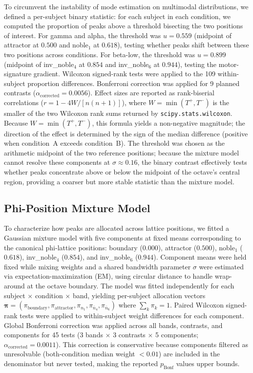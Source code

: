 \documentclass[11pt,a4paper]{article}
\begin{document}
To circumvent the instability of mode estimation on multimodal distributions, we defined a per-subject binary statistic: for each subject in each condition, we computed the proportion of peaks above a threshold bisecting the two positions of interest. For gamma and alpha, the threshold was $u = 0.559$ (midpoint of attractor at $0.500$ and noble$_1$ at $0.618$), testing whether peaks shift between these two positions across conditions. For beta-low, the threshold was $u = 0.899$ (midpoint of inv\_noble$_4$ at $0.854$ and inv\_noble$_6$ at $0.944$), testing the motor-signature gradient. Wilcoxon signed-rank tests were applied to the 109 within-subject proportion differences. Bonferroni correction was applied for 9 planned contrasts ($\alpha_{\text{corrected}} = 0.0056$). Effect sizes are reported as rank-biserial correlations ($r = 1 - 4W / [n(n+1)]$), where $W = \min(T^+, T^-)$ is the smaller of the two Wilcoxon rank sums returned by \texttt{scipy.stats.wilcoxon}. Because $W = \min(T^+, T^-)$, this formula yields a non-negative magnitude; the direction of the effect is determined by the sign of the median difference (positive when condition~A exceeds condition~B). The threshold was chosen as the arithmetic midpoint of the two reference positions; because the mixture model cannot resolve these components at $\sigma \approx 0.16$, the binary contrast effectively tests whether peaks concentrate above or below the midpoint of the octave's central region, providing a coarser but more stable statistic than the mixture model.

\subsection{Phi-Position Mixture Model}
\label{sec:mixture}

To characterize how peaks are allocated across lattice positions, we fitted a Gaussian mixture model with five components at fixed means corresponding to the canonical phi-lattice positions: boundary ($0.000$), attractor ($0.500$), noble$_1$ ($0.618$), inv\_noble$_4$ ($0.854$), and inv\_noble$_6$ ($0.944$). Component means were held fixed while mixing weights and a shared bandwidth parameter $\sigma$ were estimated via expectation-maximization (EM), using circular distance to handle wrap-around at the octave boundary. The model was fitted independently for each subject $\times$ condition $\times$ band, yielding per-subject allocation vectors $\bm{\pi} = (\pi_{\text{boundary}}, \pi_{\text{attractor}}, \pi_{n_1}, \pi_{\overline{n}_4}, \pi_{\overline{n}_6})$ where $\sum_k \pi_k = 1$. Paired Wilcoxon signed-rank tests were applied to within-subject weight differences for each component. Global Bonferroni correction was applied across all bands, contrasts, and components for 45 tests (3 bands $\times$ 3 contrasts $\times$ 5 components; $\alpha_{\text{corrected}} = 0.0011$). This correction is conservative because components filtered as unresolvable (both-condition median weight $< 0.01$) are included in the denominator but never tested, making the reported $p_{\text{Bonf}}$ values upper bounds.
\end{document}
